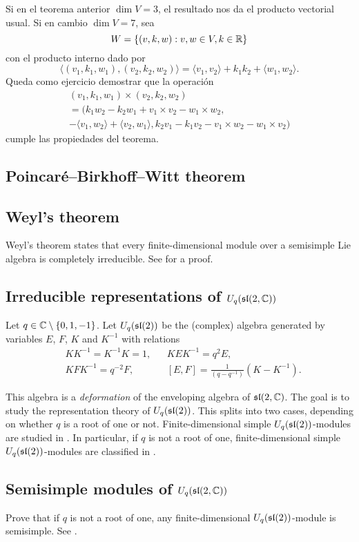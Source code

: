 Si en el teorema anterior $\dim V=3$, el resultado nos da el producto vectorial usual. Si en cambio $\dim V=7$, 
sea 
\[
	W=\{(v,k,w):v,w\in V,k\in\R\}
\]
con el producto interno dado por
\[
	\langle (v_1,k_1,w_1),(v_2,k_2,w_2)\rangle = \langle v_1,v_2\rangle+k_1k_2+\langle w_1,w_2\rangle.
\]
Queda como ejercicio demostrar que la operación
\begin{multline*}
	(v_1,k_1,w_1)\times (v_2,k_2,w_2)\\
	=(k_1w_2-k_2w_1+v_1\times v_2-w_1\times w_2,
	\\-\langle v_1,w_2\rangle+\langle v_2,w_1\rangle, 
	k_2v_1-k_1v_2-v_1\times w_2-w_1\times v_2)
\end{multline*}
cumple las propiedades del teorema.

\subsection*{Poincar\'e--Birkhoff--Witt theorem}

\subsection*{Weyl's theorem}

Weyl's theorem states that every finite-dimensional module over
a semisimple Lie algebra is completely irreducible. 
See \cite[Theorem 17.4]{MR2218355} for a proof. 

\subsection*{Irreducible representations of $U_q(\sl(2,\C))$}

Let $q\in\C\setminus\{0,1,-1\}$. 
Let $U_q(\sl(2))$ be the (complex) algebra generated by 
variables $E$, $F$, $K$ and $K^{-1}$ with relations
\begin{align*}
    &KK^{-1}=K^{-1}K=1,
    &&
    KEK^{-1}=q^2E,\\
    &
    KFK^{-1}=q^{-2}F,
    &&
    [E,F]=\frac{1}{(q-q^{-1})}(K-K^{-1}).
\end{align*}

This algebra is a \emph{deformation} of the enveloping algebra
of $\sl(2,\C)$. The goal is to study the 
representation theory of $U_q(\sl(2))$. This splits into
two cases, depending on whether $q$ is a root of one or not. 
Finite-dimensional simple $U_q(\sl(2))$-modules are studied 
in \cite[VI]{MR1321145}. In particular, if 
$q$ is not a root of one, finite-dimensional simple $U_q(\sl(2))$-modules
are classified in \cite[Theorem VI.3.5]{MR1321145}. 

\subsection*{Semisimple modules of $U_q(\sl(2,\C))$}

Prove that if $q$ is not a root of one, any finite-dimensional
$U_q(\sl(2))$-module is semisimple. 
See \cite[Theorem VII.2.2]{MR1321145}. 